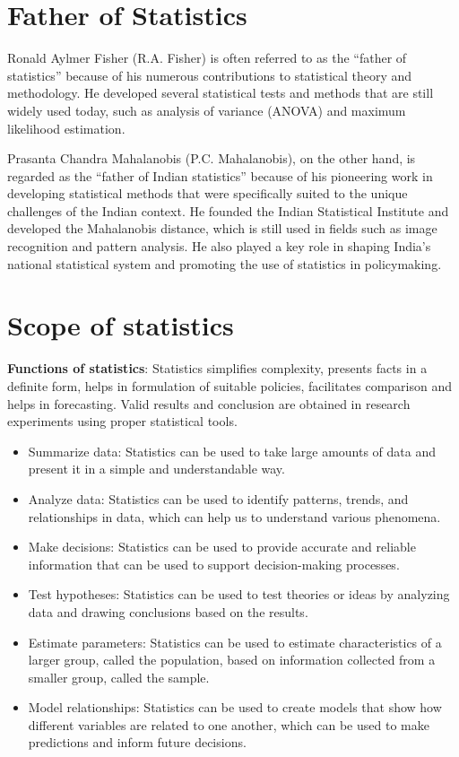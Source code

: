 \documentclass[
]{book}
\begin{document}
\hypertarget{father-of-statistics}{%
\section{Father of Statistics}\label{father-of-statistics}}

Ronald Aylmer Fisher (R.A. Fisher) is often referred to as the ``father of statistics'' because of his numerous contributions to statistical theory and methodology. He developed several statistical tests and methods that are still widely used today, such as analysis of variance (ANOVA) and maximum likelihood estimation.

Prasanta Chandra Mahalanobis (P.C. Mahalanobis), on the other hand, is regarded as the ``father of Indian statistics'' because of his pioneering work in developing statistical methods that were specifically suited to the unique challenges of the Indian context. He founded the Indian Statistical Institute and developed the Mahalanobis distance, which is still used in fields such as image recognition and pattern analysis. He also played a key role in shaping India's national statistical system and promoting the use of statistics in policymaking.

\hypertarget{scope-of-statistics}{%
\section{Scope of statistics}\label{scope-of-statistics}}

\textbf{Functions of statistics}: Statistics simplifies complexity, presents
facts in a definite form, helps in formulation of suitable policies,
facilitates comparison and helps in forecasting. Valid results and
conclusion are obtained in research experiments using proper statistical
tools.

\begin{itemize}
\item
  Summarize data: Statistics can be used to take large amounts of data and present it in a simple and understandable way.
\item
  Analyze data: Statistics can be used to identify patterns, trends, and relationships in data, which can help us to understand various phenomena.
\item
  Make decisions: Statistics can be used to provide accurate and reliable information that can be used to support decision-making processes.
\item
  Test hypotheses: Statistics can be used to test theories or ideas by analyzing data and drawing conclusions based on the results.
\item
  Estimate parameters: Statistics can be used to estimate characteristics of a larger group, called the population, based on information collected from a smaller group, called the sample.
\item
  Model relationships: Statistics can be used to create models that show how different variables are related to one another, which can be used to make predictions and inform future decisions.
\end{itemize}
\end{document}
